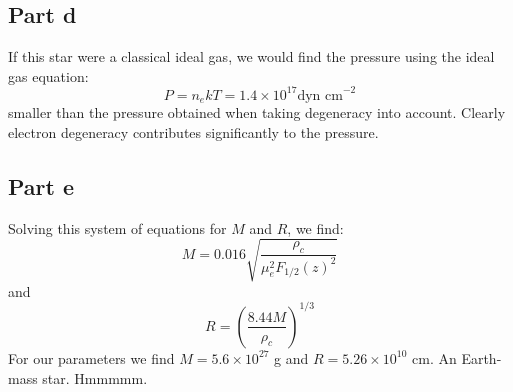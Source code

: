 \documentclass[a4paper, 11pt]{article}
\begin{document}
	\subsection*{Part d}
		If this star were a classical ideal gas, we would find the pressure using the ideal gas equation:
		\begin{equation*}
			P = n_ekT = 1.4\times10^{17} \text{dyn cm}^{-2}
		\end{equation*}
		smaller than the pressure obtained when taking degeneracy into account. Clearly electron degeneracy contributes significantly to the pressure. 
	\subsection*{Part e}
		Solving this system of equations for $M$ and $R$, we find:
		\begin{equation*}
			M = 0.016\sqrt{\frac{\rho_c}{\mu_e^2F_{1/2}(z)^2}}
		\end{equation*}
		and 
		\begin{equation*}
			R = \left(\frac{8.44M}{\rho_c}\right)^{1/3}
		\end{equation*}
		For our parameters we find $M=5.6\times10^{27}$ g and $R=5.26\times10^{10}$ cm. An 
		Earth-mass star. Hmmmmm. 
\end{document}

